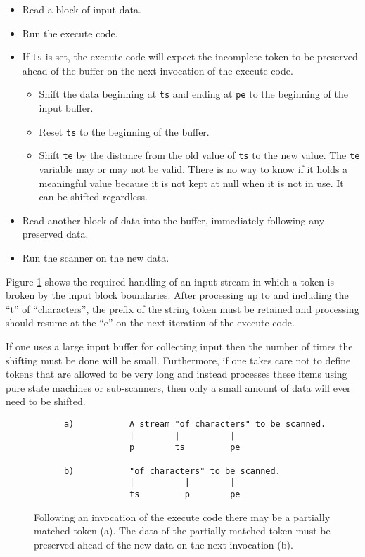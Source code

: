 \documentclass[letterpaper,11pt,oneside]{book}
\begin{document}
\begin{itemize}
\setlength{\parskip}{0pt}
\item Read a block of input data.
\item Run the execute code.
\item If \verb|ts| is set, the execute code will expect the incomplete
token to be preserved ahead of the buffer on the next invocation of the execute
code.  
\begin{itemize}
\item Shift the data beginning at \verb|ts| and ending at \verb|pe| to the
beginning of the input buffer.
\item Reset \verb|ts| to the beginning of the buffer. 
\item Shift \verb|te| by the distance from the old value of \verb|ts|
to the new value. The \verb|te| variable may or may not be valid.  There is
no way to know if it holds a meaningful value because it is not kept at null
when it is not in use. It can be shifted regardless.
\end{itemize}
\item Read another block of data into the buffer, immediately following any
preserved data.
\item Run the scanner on the new data.
\end{itemize}

Figure \ref{preserve_example} shows the required handling of an input stream in
which a token is broken by the input block boundaries. After processing up to
and including the ``t'' of ``characters'', the prefix of the string token must be
retained and processing should resume at the ``e'' on the next iteration of
the execute code.

If one uses a large input buffer for collecting input then the number of times
the shifting must be done will be small. Furthermore, if one takes care not to
define tokens that are allowed to be very long and instead processes these
items using pure state machines or sub-scanners, then only a small amount of
data will ever need to be shifted.

\begin{figure}
\small
\begin{verbatim}
      a)           A stream "of characters" to be scanned.
                   |        |          |
                   p        ts         pe

      b)           "of characters" to be scanned.
                   |          |        |
                   ts         p        pe
\end{verbatim}
\caption{Following an invocation of the execute code there may be a partially
matched token (a). The data of the partially matched token 
must be preserved ahead of the new data on the next invocation (b).
}
\label{preserve_example}
\end{figure}
\end{document}
